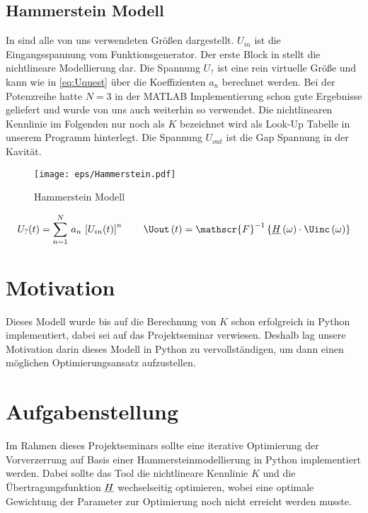 \documentclass[../Report.tex]{subfiles}
\begin{document}
\subsection{Hammerstein Modell}
\label{subsec:einf.modell_BB.hammerstein}
In  sind alle von uns verwendeten Größen dargestellt. $U_{in}$ ist die Eingangsspannung vom Funktionsgenerator. Der erste Block in  stellt die nichtlineare Modellierung dar. Die Spannung $U_{?}$ ist eine rein virtuelle Größe und kann wie in \eqref{eq:Uquest} über die Koeffizienten $a_n$ berechnet werden. Bei der Potenzreihe hatte $N = 3$ in der MATLAB Implementierung schon gute Ergebnisse geliefert und wurde von uns auch weiterhin so verwendet. Die nichtlinearen Kennlinie im Folgenden nur noch als $K$ bezeichnet wird als Look-Up Tabelle in unserem Programm hinterlegt. Die Spannung $U_{out}$ ist die Gap Spannung in der Kavität.
\begin{figure}[H]
	\centering
	\texttt{[image: eps/Hammerstein.pdf]}
	\caption{Hammerstein Modell}
  	\label{fig:Hammerstein}
\end{figure}
\begin{align}
	U_?(t)=\sum_{n=1}^N \, a_n \, \left[ U_{in}(t) \right]^n
	\label{eq:Uquest}
	\qquad
	\Uout \oft = \mathscr{F}^{-1} \left\{ \Hcompl \ofomega \cdot \Uinc \ofomega \right\}
\end{align}


\section{Motivation}
\label{sec:einf.motivation}
Dieses Modell wurde bis auf die Berechnung von $K$ schon erfolgreich in Python implementiert, dabei sei auf das Projektseminar \cite{PJS_Denys} verwiesen. Deshalb lag unsere Motivation darin dieses Modell in Python zu vervollständigen, um dann einen möglichen Optimierungsansatz aufzustellen.


\section{Aufgabenstellung}
\label{sec:einf.aufgabe}
Im Rahmen dieses Projektseminars sollte eine iterative Optimierung der Vorverzerrung auf Basis einer Hammersteinmodellierung in Python implementiert werden. Dabei sollte das Tool die nichtlineare Kennlinie $K$ und die Übertragungsfunktion $\underline{H}$ wechselseitig optimieren, wobei eine optimale Gewichtung der Parameter zur Optimierung noch nicht erreicht werden musste.
\end{document}
